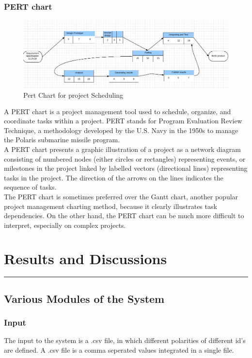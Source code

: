 \subsection{PERT chart}
\begin{figure}[h]
	\centering
	\includegraphics[width=1\linewidth]{pert_final}
	\caption{Pert Chart for project Scheduling}
\end{figure}
A PERT chart is a project management tool used to schedule, organize, and coordinate tasks within a project. PERT stands for Program Evaluation Review Technique, a methodology developed by the U.S. Navy in the 1950s to manage the Polaris submarine missile program.\\
A PERT chart presents a graphic illustration of a project as a network diagram consisting of numbered nodes (either circles or rectangles) representing events, or milestones in the project linked by labelled vectors (directional lines) representing tasks in the project. The direction of the arrows on the lines indicates the sequence of tasks.\\
The PERT chart is sometimes preferred over the Gantt chart, another popular project management charting method, because it clearly illustrates task dependencies. On the other hand, the PERT chart can be much more difficult to interpret, especially on complex projects.

\chapter{Results and Discussions}\hrule
\label{Chapter:5}
\section{Various Modules of the System}

\subsection{Input}
The input to the system is a .csv file, in which different polarities of different id's are defined. A .csv file is a comma seperated values integrated in a single file.

